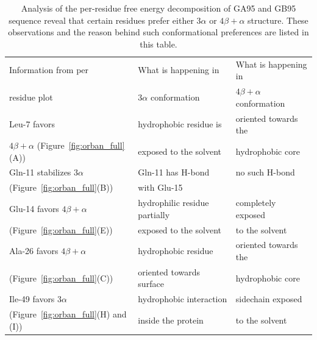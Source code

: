 \documentclass[12pt]{article}
\begin{document}
\begin{table}
\begin{center}
\caption{Analysis of the per-residue free energy decomposition of GA95 and GB95 sequence reveal that certain residues prefer
either $3 \alpha$  or $4 \beta + \alpha$ structure. These observations and the reason behind such conformational preferences are listed in this
table.}
\label{table:orban_perresidue}
\begin{tabular}{| l | l | l |}
\hline
    Information from per                                 & What is happening in           & What is happening in                      \\
    residue plot                                         & $3 \alpha$ conformation        & $4 \beta + \alpha$  conformation          \\ \hline
    Leu-7 favors                                         & hydrophobic residue is         & oriented towards the                      \\
    $4 \beta + \alpha$ (Figure~\ref{fig:orban_full}(A))  & exposed to the solvent         & hydrophobic core                          \\ \hline
    Gln-11 stabilizes $3 \alpha$                   & Gln-11 has H-bond                         & no such H-bond                           \\
    (Figure~\ref{fig:orban_full}(B))           &  with Glu-15                              &                                           \\ \hline
    Glu-14 favors $4 \beta + \alpha$           & hydrophilic residue partially  & completely exposed                                    \\
    (Figure~\ref{fig:orban_full}(E))           & exposed to the solvent         & to the solvent                                        \\ \hline
    Ala-26 favors  $4 \beta + \alpha$          & hydrophobic residue            & oriented towards the                                   \\
     (Figure~\ref{fig:orban_full}(C))          & oriented towards surface       & hydrophobic core                                       \\ \hline
    Ile-49 favors $3 \alpha$                   & hydrophobic interaction        & sidechain exposed                                       \\
    (Figure~\ref{fig:orban_full}(H) and (I))   & inside the protein             & to the solvent                                          \\ \hline

\end{tabular}
\end{center}
\end{table}
\end{document}
